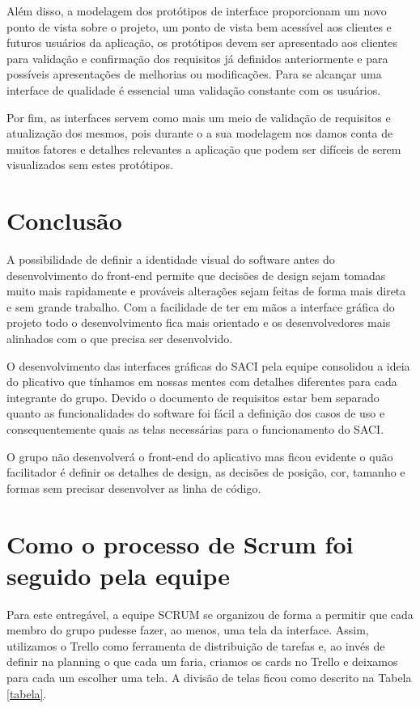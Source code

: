 \documentclass[12pt]{article}
\begin{document}
Além disso, a modelagem dos protótipos de interface proporcionam um novo ponto de vista sobre o projeto, um ponto de vista bem acessível aos clientes e futuros usuários da aplicação, os protótipos devem ser apresentado aos clientes para validação e confirmação dos requisitos já definidos anteriormente e para possíveis apresentações de melhorias ou modificações. Para se alcançar uma interface de qualidade é essencial uma validação constante com os usuários.

Por fim, as interfaces servem como mais um meio de validação de requisitos e atualização dos mesmos, pois durante o a sua modelagem nos damos conta de muitos fatores e detalhes relevantes a aplicação que podem ser difíceis de serem visualizados sem estes protótipos.


\section{Conclusão}

A possibilidade de definir a identidade visual do software antes do desenvolvimento do front-end permite que decisões de design sejam tomadas muito mais rapidamente e prováveis alterações sejam feitas de forma mais direta e sem grande trabalho. Com a facilidade de ter em mãos a interface gráfica do projeto todo o desenvolvimento fica mais orientado e os desenvolvedores mais alinhados com o que precisa ser desenvolvido.

O desenvolvimento das interfaces gráficas do SACI pela equipe consolidou a ideia do plicativo que tínhamos em nossas mentes com detalhes diferentes para cada integrante do grupo. Devido o documento de requisitos estar bem separado quanto as funcionalidades do software foi fácil a definição dos casos de uso e consequentemente quais as telas necessárias para o funcionamento do SACI.

O grupo não desenvolverá o front-end do aplicativo mas ficou evidente o quão facilitador é definir os detalhes de design, as decisões de posição, cor, tamanho e formas sem precisar desenvolver as linha de código.

\section{Como o processo de Scrum foi seguido pela equipe}
Para este entregável, a equipe SCRUM se organizou de forma a permitir que cada membro do grupo pudesse fazer, ao menos, uma tela da interface. Assim, utilizamos o Trello como ferramenta de distribuição de tarefas e, ao invés de definir na planning o que cada um faria, criamos os cards no Trello e deixamos para cada um escolher uma tela. A divisão de telas ficou como descrito na Tabela \ref{tabela}.
\end{document}
